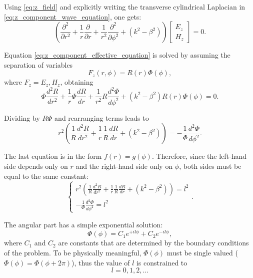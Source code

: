 Using \eqref{eq:z_field} and explicitly writing the transverse cylindrical Laplacian in  \eqref{eq:z_component_wave_equation}, one gets:
\begin{equation}
    \label{eq:z_component_effective_equation}
    \left(
    \frac{\partial^2}{\partial r^2} +
    \frac{1}{r} \frac{\partial}{\partial r} +
    \frac{1}{r^2}\frac{\partial^2}{\partial\phi^2}+
    (k^2 - \beta^2)
    \right)
    \begin{bmatrix}
        E_z \\
        H_z
    \end{bmatrix}
    =0.
\end{equation}

Equation \eqref{eq:z_component_effective_equation} is solved by assuming the separation of variables
\begin{equation}
    F_z(r, \phi)=R(r)\Phi(\phi),
\end{equation}
where $F_z=E_z, H_z$, obtaining
\begin{equation}
    \Phi \frac{d^2R}{dr^2} + \frac{1}{r}\Phi\frac{dR}{dr} + \frac{1}{r^2}R\frac{d^2\Phi}{d\phi^2} +(k^2-\beta^2)R(r)\Phi(\phi) =0.
\end{equation}

Dividing by $R\Phi$ and rearranging terms leads to
\begin{equation}
    r^2
    \left(
    \frac{1}{R}\frac{d^2R}{dr^2}+
    \frac{1}{r}\frac{1}{R}\frac{dR}{dr}+
    (k^2 - \beta^2)
    \right)
    =
    -\frac{1}{\Phi}\frac{d^2\Phi}{d\phi^2}.
\end{equation}

The last equation is in the form $f(r)=g(\phi)$. Therefore, since the left-hand side depends only on $r$ and the right-hand side only on $\phi$, both sides must be equal to the same constant:
\begin{equation}
    \begin{cases}
        r^2
        \left(
        \frac{1}{R}\frac{d^2R}{dr^2}+
        \frac{1}{r}\frac{1}{R}\frac{dR}{dr}+
        (k^2-\beta^2)
        \right)
        = l^2 \\[3mm]
        -\frac{1}{\Phi}\frac{d^2\Phi}{d\phi^2} = l^2
    \end{cases}.
\end{equation}

The angular part has a simple exponential solution:
\begin{equation}
    \Phi(\phi) = C_1e^{+il\phi} + C_2 e^{-il\phi},
\end{equation}
where $C_1$ and $C_2$ are constants that are determined by the boundary conditions of the problem. To be physically meaningful, $\Phi(\phi)$ must be single valued ($\Phi(\phi)=\Phi(\phi + 2\pi)$), thus the value of $l$ is constrained to
\begin{equation}
    l = 0,1,2,...
\end{equation}

